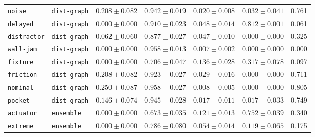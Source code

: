 \documentclass{article}
\begin{document}
\begin{center}
\begin{tabular}{llccccc}
\texttt{noise} & \texttt{dist-graph} & $0.208 \pm 0.082$ & $0.942 \pm 0.019$ & $0.020 \pm 0.008$ & $0.032 \pm 0.041$ & 0.761 \\
\texttt{delayed} & \texttt{dist-graph} & $0.000 \pm 0.000$ & $0.910 \pm 0.023$ & $0.048 \pm 0.014$ & $0.812 \pm 0.001$ & 0.061 \\
\texttt{distractor} & \texttt{dist-graph} & $0.062 \pm 0.060$ & $0.877 \pm 0.027$ & $0.047 \pm 0.010$ & $0.000 \pm 0.000$ & 0.325 \\
\texttt{wall-jam} & \texttt{dist-graph} & $0.000 \pm 0.000$ & $0.958 \pm 0.013$ & $0.007 \pm 0.002$ & $0.000 \pm 0.000$ & 0.000 \\
\texttt{fixture} & \texttt{dist-graph} & $0.000 \pm 0.000$ & $0.706 \pm 0.047$ & $0.136 \pm 0.028$ & $0.317 \pm 0.078$ & 0.097 \\
\texttt{friction} & \texttt{dist-graph} & $0.208 \pm 0.082$ & $0.923 \pm 0.027$ & $0.029 \pm 0.016$ & $0.000 \pm 0.000$ & 0.711 \\
\texttt{nominal} & \texttt{dist-graph} & $0.250 \pm 0.087$ & $0.958 \pm 0.027$ & $0.008 \pm 0.005$ & $0.000 \pm 0.000$ & 0.805 \\
\texttt{pocket} & \texttt{dist-graph} & $0.146 \pm 0.074$ & $0.945 \pm 0.028$ & $0.017 \pm 0.011$ & $0.017 \pm 0.033$ & 0.749 \\
\texttt{actuator} & \texttt{ensemble} & $0.000 \pm 0.000$ & $0.673 \pm 0.035$ & $0.121 \pm 0.013$ & $0.752 \pm 0.039$ & 0.340 \\
\texttt{extreme} & \texttt{ensemble} & $0.000 \pm 0.000$ & $0.786 \pm 0.080$ & $0.054 \pm 0.014$ & $0.119 \pm 0.065$ & 0.175 \\
\bottomrule
\end{tabular}
\end{center}
\end{document}
